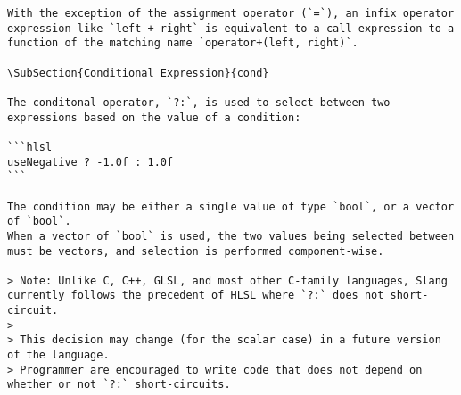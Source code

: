 \begin{verbatim}
With the exception of the assignment operator (`=`), an infix operator expression like `left + right` is equivalent to a call expression to a function of the matching name `operator+(left, right)`.

\SubSection{Conditional Expression}{cond}

The conditonal operator, `?:`, is used to select between two expressions based on the value of a condition:

```hlsl
useNegative ? -1.0f : 1.0f
```

The condition may be either a single value of type `bool`, or a vector of `bool`.
When a vector of `bool` is used, the two values being selected between must be vectors, and selection is performed component-wise.

> Note: Unlike C, C++, GLSL, and most other C-family languages, Slang currently follows the precedent of HLSL where `?:` does not short-circuit.
>
> This decision may change (for the scalar case) in a future version of the language.
> Programmer are encouraged to write code that does not depend on whether or not `?:` short-circuits.
\end{verbatim}